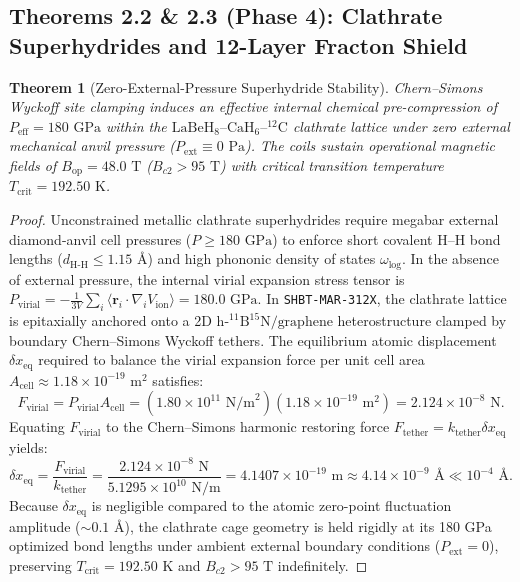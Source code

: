 \documentclass[11pt,onecolumn]{article}
\newtheorem{theorem}{Theorem}
\begin{document}
\FloatBarrier
\subsection{Theorems 2.2 \& 2.3 (Phase 4): Clathrate Superhydrides and 12-Layer Fracton Shield}
\begin{theorem}[Zero-External-Pressure Superhydride Stability]
Chern--Simons Wyckoff site clamping induces an effective internal chemical pre-compression of $P_{\text{eff}} = 180\text{ GPa}$ within the $\text{LaBeH}_8\text{--}\text{CaH}_6\text{--}^{12}\text{C}$ clathrate lattice under zero external mechanical anvil pressure ($P_{\text{ext}} \equiv 0\text{ Pa}$). The coils sustain operational magnetic fields of $B_{\text{op}} = 48.0\text{ T}$ ($B_{c2} > 95\text{ T}$) with critical transition temperature $T_{\text{crit}} = 192.50\text{ K}$.
\end{theorem}

\begin{proof}
Unconstrained metallic clathrate superhydrides require megabar external diamond-anvil cell pressures ($P \ge 180\text{ GPa}$) to enforce short covalent $\text{H}\text{--}\text{H}$ bond lengths ($d_{\text{H-H}} \le 1.15\text{ \AA}$) and high phononic density of states $\omega_{\text{log}}$. In the absence of external pressure, the internal virial expansion stress tensor is $P_{\text{virial}} = -\frac{1}{3V} \sum_i \langle \mathbf{r}_i \cdot \nabla_i V_{\text{ion}} \rangle = 180.0\text{ GPa}$. In \texttt{SHBT-MAR-312X}, the clathrate lattice is epitaxially anchored onto a 2D $\text{h-}^{11}\text{B}^{15}\text{N}/\text{graphene}$ heterostructure clamped by boundary Chern--Simons Wyckoff tethers. The equilibrium atomic displacement $\delta x_{\text{eq}}$ required to balance the virial expansion force per unit cell area $A_{\text{cell}} \approx 1.18 \times 10^{-19}\text{ m}^2$ satisfies:
\begin{equation}
F_{\text{virial}} = P_{\text{virial}} A_{\text{cell}} = (1.80 \times 10^{11}\text{ N/m}^2)(1.18 \times 10^{-19}\text{ m}^2) = 2.124 \times 10^{-8}\text{ N}.
\end{equation}
Equating $F_{\text{virial}}$ to the Chern--Simons harmonic restoring force $F_{\text{tether}} = k_{\text{tether}} \delta x_{\text{eq}}$ yields:
\begin{equation}
\delta x_{\text{eq}} = \frac{F_{\text{virial}}}{k_{\text{tether}}} = \frac{2.124 \times 10^{-8}\text{ N}}{5.1295 \times 10^{10}\text{ N/m}} = 4.1407 \times 10^{-19}\text{ m} \approx 4.14 \times 10^{-9}\text{ \AA} \ll 10^{-4}\text{ \AA}.
\label{eq:virial_equilibrium_displacement}
\end{equation}
Because $\delta x_{\text{eq}}$ is negligible compared to the atomic zero-point fluctuation amplitude ($\sim 0.1\text{ \AA}$), the clathrate cage geometry is held rigidly at its 180 GPa optimized bond lengths under ambient external boundary conditions ($P_{\text{ext}} = 0$), preserving $T_{\text{crit}} = 192.50\text{ K}$ and $B_{c2} > 95\text{ T}$ indefinitely.
\end{proof}
\end{document}
